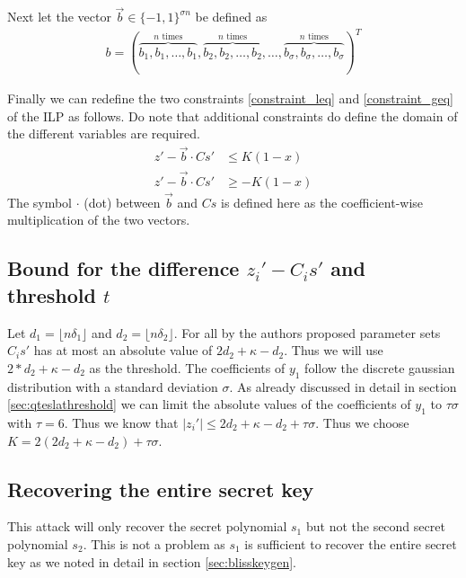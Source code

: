 \documentclass[a4paper,titlepage]{article}
\begin{document}
Next let the vector $\vec{b} \in \{-1, 1\}^{\sigma n}$ be defined as
\begin{align}
	b = (\overbrace{b_{1}, b_{1}, \ldots, b_{1}}^{n \text{ times}}, \overbrace{b_{2}, b_{2}, \ldots, b_{2}}^{n \text{ times}}, \ldots, \overbrace{b_{σ}, b_{σ}, \ldots, b_{σ}}^{n \text{ times}})^{T}
\end{align}

Finally we can redefine the two constraints \eqref{constraint_leq} and \eqref{constraint_geq} of the ILP as follows. Do note that additional constraints do define the domain of the different variables are required.
\begin{align}
	\label{constraint_leq_bliss}
	z' - \vec{b} \cdot Cs' & \leq K (1 - x) \\
	\label{constraint_geq_bliss}
	z' - \vec{b} \cdot Cs'  & \geq - K (1 - x)
\end{align}
The symbol $\cdot$ (dot) between $\vec{b}$ and $Cs$ is defined here as the coefficient-wise multiplication of the two vectors.

\subsection{Bound for the difference $z_{i}' - C_{i}s'$ and threshold $t$}
Let $d_{1} = \lfloor nδ_{1} \rfloor$ and $d_{2} =  \lfloor nδ_{2} \rfloor$. For all by the authors proposed parameter sets $C_{i}s'$ has at most an absolute value of $2 d_{2} + κ - d_{2}$. Thus we will use $2 * d_{2} + κ - d_{2}$ as the threshold.
The coefficients of $y_{1}$ follow the discrete gaussian distribution with a standard deviation $σ$. As already discussed in detail in section \ref{sec:qteslathreshold} we can limit the absolute values of the coefficients of $y_{1}$ to $τ σ$ with $τ = 6$. Thus we know that $\lvert z_{i}' \rvert \leq 2 d_{2} + κ - d_{2} + τ σ$. Thus we choose $K = 2 (2 d_{2} + κ - d_{2}) + τ σ$.


\subsection{Recovering the entire secret key}
This attack will only recover the secret polynomial $s_{1}$ but not the second secret polynomial $s_{2}$. This is not a problem as $s_{1}$ is sufficient to recover the entire secret key as we noted in detail in section \ref{sec:blisskeygen}.
\end{document}

